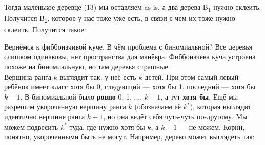 \documentclass{article}
\begin{document}
    Тогда маленькое деревце (13) мы оставляем as is, а два дерева B\textsubscript1 нужно склеить. Получится B\textsubscript2, которое у нас тоже уже есть, в связи с чем их тоже нужно склеить. Получится такое:
    \begin{center}
    \end{center}
    Вернёмся к фиббоначивой куче. В чём проблема с биномиальной? Все деревья слишком одинаковы, нет пространства для манёвра. Фиббоначева куча устроена похоже на биномиальную, но там деревья страшные.\\
    Вершина ранга $k$ выглядит так: у неё есть $k$ детей. При этом самый левый ребёнок имеет класс хотя бы 0, следующий --- хотя бы 1, последний --- хотя бы $k-1$. В биномиальной было \textbf{ровно} 0, 1, ..., $k-1$, а тут \textbf{хотя бы}. Ещё мы разрешим укороченную вершину ранга $k$ (обозначаем её $k^*$), которая выглядит идентично вершине ранга $k-1$, но она ведёт себя чуть-чуть по-другому. Мы можем подвесить $k^*$ туда, где нужно хотя бы $k$, а $k-1$ --- не можем. Корни, понятно, укороченными быть не могут. Например, дерево может выглядеть так:
    \begin{center}
    \end{center}
\end{document}
